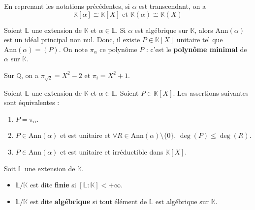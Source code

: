   \begin{proposition}
    En reprenant les notations précédentes, si $\alpha$ est transcendant, on a
    \[ \mathbb{K}[\alpha] \cong \mathbb{K}[X] \text{ et } \mathbb{K}(\alpha) \cong \mathbb{K}(X) \]
  \end{proposition}

  \begin{definition}
    Soient $\mathbb{L}$ une extension de $\mathbb{K}$ et $\alpha \in \mathbb{L}$. Si $\alpha$ est algébrique sur $\mathbb{K}$, alors $\mathrm{Ann}(\alpha)$ est un idéal principal non nul. Donc, il existe $P \in \mathbb{K}[X]$ unitaire tel que $\mathrm{Ann}(\alpha) = (P)$. On note $\pi_\alpha$ ce polynôme $P$ : c'est le \textbf{polynôme minimal} de $\alpha$ sur $\mathbb{K}$.
  \end{definition}

  \begin{example}
    Sur $\mathbb{Q}$, on a $\pi_{\sqrt{2}} = X^2 - 2$ et $\pi_i = X^2 + 1$.
  \end{example}


  \begin{proposition}
    Soient $\mathbb{L}$ une extension de $\mathbb{K}$ et $\alpha \in \mathbb{L}$. Soient $P \in \mathbb{K}[X]$. Les assertions suivantes sont équivalentes :
    \begin{enumerate}[label={\bfseries(\roman*)}]
      \item $P = \pi_\alpha$.
      \item $P \in \mathrm{Ann}(\alpha)$ et est unitaire et $\forall R \in \mathrm{Ann}(\alpha) \setminus \{ 0 \}, \, \deg(P) \leq \deg(R)$.
      \item $P \in \mathrm{Ann}(\alpha)$ et est unitaire et irréductible dans $\mathbb{K}[X]$.
    \end{enumerate}
  \end{proposition}


  \begin{definition}
    Soit $\mathbb{L}$ une extension de $\mathbb{K}$.
    \begin{itemize}
      \item $\mathbb{L}/\mathbb{K}$ est dite \textbf{finie} si $[\mathbb{L}:\mathbb{K}] < +\infty$.
      \item $\mathbb{L}/\mathbb{K}$ est dite \textbf{algébrique} si tout élément de $\mathbb{L}$ est algébrique sur $\mathbb{K}$.
    \end{itemize}
  \end{definition}

